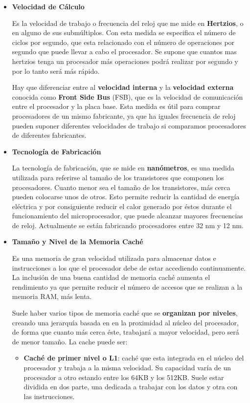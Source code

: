 \begin{itemize}
    \item \textbf{Velocidad de Cálculo}

    Es la velocidad de trabajo o frecuencia del reloj que me mide en \textbf{Hertzios}, o en alguno de sus submúltiplos. Con esta medida se especifica el número de ciclos por segundo, que esta relacionado con el número de operaciones por segundo que puede llevar a cabo el procesador. Se supone que cuantos mas hertzios tenga un procesador más operaciones podrá realizar por segundo y por lo tanto será más rápido.

    Hay que diferenciar entre al \textbf{velocidad interna} y la \textbf{velocidad externa} conocida como \textbf{Front Side Bus} (FSB), que es la velocidad de comunicación entre el procesador y la placa base. Esta medida es útil para comprar procesadores de un mismo fabricante, ya que ha iguales frecuencia de reloj pueden suponer diferentes velocidades de trabajo si comparamos procesadores de diferentes fabricantes.

    \item \textbf{Tecnología de Fabricación}

    La tecnología de fabricación, que se mide en \textbf{nanómetros}, es una medida utilizada para referirse al tamaño de los transistores que componen los procesadores. Cuanto menor sea el tamaño de los transistores, más cerca pueden colocarse unos de otros. Esto permite reducir la cantidad de energía eléctrica y por consiguiente reducir el calor generado por éstos durante el funcionamiento del microprocesador, que puede alcanzar mayores frecuencias de reloj. Actualmente se están fabricando procesadores entre 32 nm y 12 nm.

    \item \textbf{Tamaño y Nivel de la Memoria Caché}

    Es una memoria de gran velocidad utilizada para almacenar datos e instrucciones a los que el procesador debe de estar accediendo continuamente. La inclusión de una buena cantidad de memoria caché aumenta el rendimiento ya que permite reducir el número de accesos que se realizan a la memoria RAM, más lenta.

    Suele haber varios tipos de memoria caché que se \textbf{organizan por niveles}, creando una jerarquía basada en en la proximidad al núcleo del procesador, de forma que cuanto más cerca éste, trabajará a mayor velocidad, pero será de menor tamaño. La cache puede ser:

    \begin{itemize}
        \item \textbf{Caché de primer nivel o L1}: caché que esta integrada en el núcleo del procesador y trabaja a la misma velocidad. Su capacidad varía de un procesador a otro estando entre los 64KB y los 512KB. Suele estar dividida en dos parte, una dedicada a trabajar con los datos y otra con las instrucciones.


\end{itemize}
\end{itemize}
